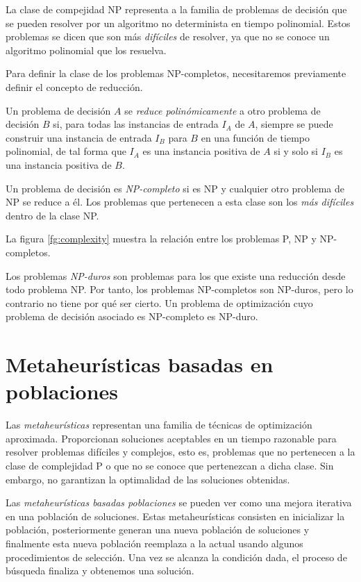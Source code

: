 La clase de compejidad NP representa a la familia de problemas de decisión que se pueden resolver por un algoritmo no determinista en tiempo polinomial. Estos problemas se dicen que son más \emph{difíciles} de resolver, ya que no se conoce un algoritmo polinomial que los resuelva.

Para definir la clase de los problemas NP-completos, necesitaremos previamente definir el concepto de reducción.

\begin{definition}
    Un problema de decisión $A$ se \emph{reduce polinómicamente} a otro problema de decisión $B$ si, para todas las instancias de entrada $I_A$ de $A$, siempre se puede construir una instancia de entrada $I_B$ para $B$ en una función de tiempo polinomial, de tal forma que $I_A$ es una instancia positiva de $A$ si y solo si $I_B$ es una instancia positiva de $B$.
\end{definition}

Un problema de decisión es \emph{NP-completo} si es NP y cualquier otro problema de NP se reduce a él. Los problemas que pertenecen a esta clase son los \emph{más difíciles} dentro de la clase NP.

La figura \ref{fg:complexity} muestra la relación entre los problemas P, NP y NP-completos.

Los problemas \emph{NP-duros} son problemas para los que existe una reducción desde todo problema NP. Por tanto, los problemas NP-completos son NP-duros, pero lo contrario no tiene por qué ser cierto. Un problema de optimización cuyo problema de decisión asociado es NP-completo es NP-duro.

\section{Metaheurísticas basadas en poblaciones}

Las \emph{metaheurísticas} representan una familia de técnicas de optimización aproximada. Proporcionan soluciones aceptables en un tiempo razonable para resolver problemas difíciles y complejos, esto es, problemas que no pertenecen a la clase de complejidad P o que no se conoce que pertenezcan a dicha clase. Sin embargo, no garantizan la optimalidad de las soluciones obtenidas.

Las \emph{metaheurísticas basadas poblaciones} se pueden ver como una mejora iterativa en una población de soluciones. Estas metaheurísticas consisten en inicializar la población, posteriormente generan una nueva población de soluciones y finalmente esta nueva población reemplaza a la actual usando algunos procedimientos de selección. Una vez se alcanza la condición dada, el proceso de búsqueda finaliza y obtenemos una solución.

